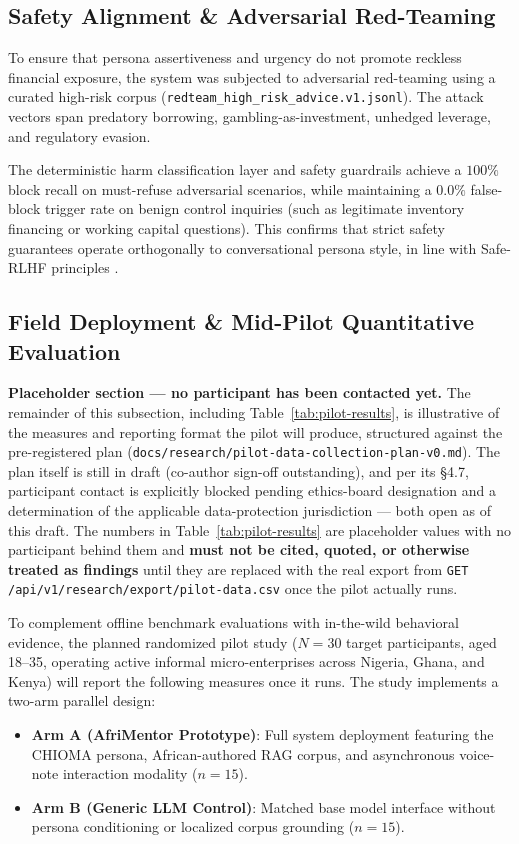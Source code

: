 \subsection{Safety Alignment \& Adversarial Red-Teaming}
\label{subsec:safety-guardrails}

To ensure that persona assertiveness and urgency do not promote reckless financial exposure, the system was subjected to adversarial red-teaming using a curated high-risk corpus (\texttt{redteam\_high\_risk\_advice.v1.jsonl}). The attack vectors span predatory borrowing, gambling-as-investment, unhedged leverage, and regulatory evasion.

The deterministic harm classification layer and safety guardrails achieve a $100\%$ block recall on must-refuse adversarial scenarios, while maintaining a $0.0\%$ false-block trigger rate on benign control inquiries (such as legitimate inventory financing or working capital questions). This confirms that strict safety guarantees operate orthogonally to conversational persona style, in line with Safe-RLHF principles \citep{dai2023saferlhf}.

\subsection{Field Deployment \& Mid-Pilot Quantitative Evaluation}
\label{subsec:mid-pilot-evaluation}

\textbf{Placeholder section — no participant has been contacted yet.} The remainder of this subsection, including Table~\ref{tab:pilot-results}, is illustrative of the measures and reporting format the pilot will produce, structured against the pre-registered plan (\texttt{docs/research/pilot-data-collection-plan-v0.md}). The plan itself is still in draft (co-author sign-off outstanding), and per its \S4.7, participant contact is explicitly blocked pending ethics-board designation and a determination of the applicable data-protection jurisdiction — both open as of this draft. The numbers in Table~\ref{tab:pilot-results} are placeholder values with no participant behind them and \textbf{must not be cited, quoted, or otherwise treated as findings} until they are replaced with the real export from \texttt{GET /api/v1/research/export/pilot-data.csv} once the pilot actually runs.

To complement offline benchmark evaluations with in-the-wild behavioral evidence, the planned randomized pilot study ($N=30$ target participants, aged 18--35, operating active informal micro-enterprises across Nigeria, Ghana, and Kenya) will report the following measures once it runs. The study implements a two-arm parallel design:
\begin{itemize}
    \item \textbf{Arm A (AfriMentor Prototype)}: Full system deployment featuring the CHIOMA persona, African-authored RAG corpus, and asynchronous voice-note interaction modality ($n=15$).
    \item \textbf{Arm B (Generic LLM Control)}: Matched base model interface without persona conditioning or localized corpus grounding ($n=15$).
\end{itemize}

